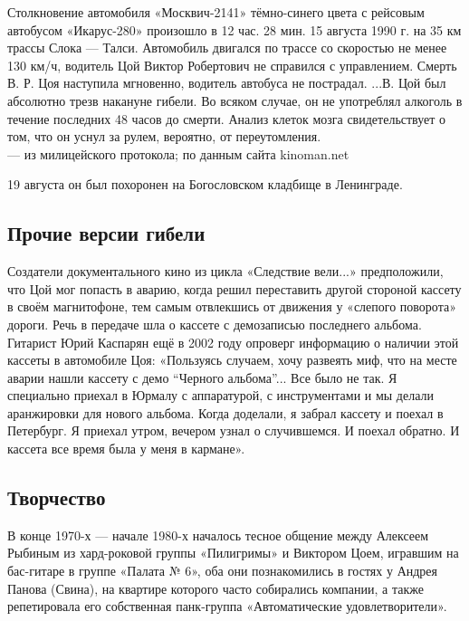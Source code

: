 \begin{fancyquotes}
    Столкновение автомобиля «Москвич-2141» тёмно-синего цвета с рейсовым автобусом «Икарус-280» произошло в 12 час. 28 мин. 15 августа 1990 г. на 35 км трассы Слока --- Талси. Автомобиль двигался по трассе со скоростью не менее 130 км/ч, водитель Цой Виктор Робертович не справился с управлением. Смерть В. Р. Цоя наступила мгновенно, водитель автобуса не пострадал. ...В. Цой был абсолютно трезв накануне гибели. Во всяком случае, он не употреблял алкоголь в течение последних 48 часов до смерти. Анализ клеток мозга свидетельствует о том, что он уснул за рулем, вероятно, от переутомления.\\

    --- из милицейского протокола; по данным сайта kinoman.net
\end{fancyquotes}




19 августа он был похоронен на Богословском кладбище в Ленинграде.

\subsection{Прочие версии гибели}
Создатели документального кино из цикла «Следствие вели...» предположили, что Цой мог попасть в аварию, когда решил переставить другой стороной кассету в своём магнитофоне, тем самым отвлекшись от движения у «слепого поворота» дороги. Речь в передаче шла о кассете с демозаписью последнего альбома. Гитарист Юрий Каспарян ещё в 2002 году опроверг информацию о наличии этой кассеты в автомобиле Цоя: «Пользуясь случаем, хочу развеять миф, что на месте аварии нашли кассету с демо ``Черного альбома''... Все было не так. Я специально приехал в Юрмалу с аппаратурой, с инструментами и мы делали аранжировки для нового альбома. Когда доделали, я забрал кассету и поехал в Петербург. Я приехал утром, вечером узнал о случившемся. И поехал обратно. И кассета все время была у меня в кармане».


\subsection{Творчество}
В конце 1970-х --- начале 1980-х началось тесное общение между Алексеем Рыбиным из хард-роковой группы «Пилигримы» и Виктором Цоем, игравшим на бас-гитаре в группе «Палата № 6», оба они познакомились в гостях у Андрея Панова (Свина), на квартире которого часто собирались компании, а также репетировала его собственная панк-группа «Автоматические удовлетворители».

